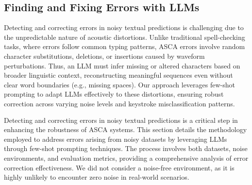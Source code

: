 \subsection{Finding and Fixing Errors with LLMs}
Detecting and correcting errors in noisy textual predictions is challenging due to the unpredictable nature of acoustic distortions. Unlike traditional spell-checking tasks, where errors follow common typing patterns, ASCA errors involve random character substitutions, deletions, or insertions caused by waveform perturbations. Thus, an LLM must infer missing or altered characters based on broader linguistic context, reconstructing meaningful sequences even without clear word boundaries (e.g., missing spaces). Our approach leverages few-shot prompting to adapt LLMs effectively to these distortions, ensuring robust correction across varying noise levels and keystroke misclassification patterns.

Detecting and correcting errors in noisy textual predictions is a critical step in enhancing the robustness of ASCA systems. This section details the methodology employed to address errors arising from noisy datasets by leveraging LLMs through few-shot prompting techniques. The process involves both datasets, noise environments, and evaluation metrics, providing a comprehensive analysis of error correction effectiveness. We did not consider a noise-free environment, as it is highly unlikely to encounter zero noise in real-world scenarios.

